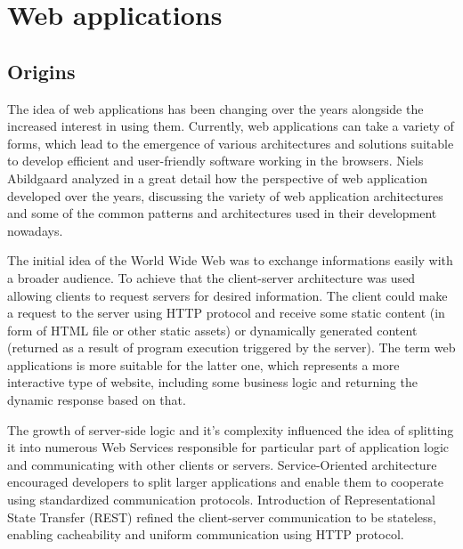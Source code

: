 \chapter{Web applications}


\section{Origins}

The idea of web applications has been changing over the years alongside the increased interest in using them. Currently, web applications can take a variety of forms, which lead to the emergence of various architectures and solutions suitable to develop efficient and user-friendly software working in the browsers. Niels Abildgaard \cite{PerspectivesOnArchitectureEvolution} analyzed in a great detail how the perspective of web application developed over the years, discussing the variety of web application architectures and some of the common patterns and architectures used in their development nowadays.

The initial idea of the World Wide Web was to exchange informations easily with a broader audience. To achieve that the client-server architecture was used allowing clients to request servers for desired information. The client could make a request to the server using HTTP protocol and receive some static content (in form of HTML file or other static assets) or dynamically generated content (returned as a result of program execution triggered by the server). The term web applications is more suitable for the latter one, which represents a more interactive type of website, including some business logic and returning the dynamic response based on that.

The growth of server-side logic and it's complexity influenced the idea of splitting it into numerous Web Services responsible for particular part of application logic and communicating with other clients or servers. Service-Oriented architecture encouraged developers to split larger applications and enable them to cooperate using standardized communication protocols. Introduction of Representational State Transfer (REST) refined the client-server communication to be stateless, enabling cacheability and uniform communication using HTTP protocol.

